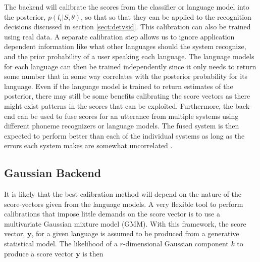 The backend will calibrate the scores from the classifier or language model into the posterior, $p(l_i | S, \theta)$, so that so that they can be applied to the recognition decisions discussed in section \ref{sect:detvsid}. This calibration can also be trained using real data. A separate calibration step allows us to ignore application dependent information like what other languages should the system recognize, and the prior probability of a user speaking each language. The language models for each language can then be trained independently since it only needs to return some number that in some way correlates with the posterior probability for its language. Even if the language model is trained to return estimates of the posterior, there may still be some benefits calibrating the score vectors \cite[p. 820]{lidbok} as there might exist patterns in the scores that can be exploited. Furthermore, the back-end can be used to fuse scores for an utterance from multiple systems using different phoneme recognizers or language models. The fused system is then expected to perform better than each of the individual systems as long as the errors each system makes are somewhat uncorrelated \cite[p. 818]{lidbok}.

\subsection{Gaussian Backend}
\label{sect:gmmscore}

It is likely that the best calibration method will depend on the nature of the score-vectors given from the language models. A very flexible tool to perform calibrations that impose little demands on the score vector is to use a multivariate Gaussian mixture model (GMM). With this framework, the score vector, $\mathbf{y}$, for a given language is assumed to be produced from a generative statistical model. The likelihood of a $r$-dimensional Gaussian component $k$ to produce a score vector $\mathbf{y}$ is then

